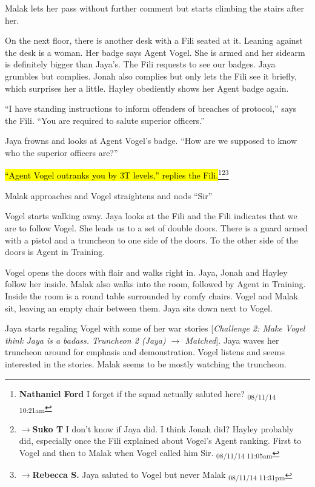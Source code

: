 Malak lets her pass without further comment but starts climbing the stairs after her.



On the next floor, there is another desk with a Fili seated at it.  Leaning against the desk is a woman. Her badge says Agent Vogel.  She is armed and her sidearm is definitely bigger than Jaya's.  The Fili requests to see our badges.  Jaya grumbles but complies.  Jonah also complies but only lets the Fili see it briefly, which surprises her a little.  Hayley obediently shows her Agent badge again.

``I have standing instructions to inform offenders of breaches of protocol,'' says the Fili.  ``You are required to salute superior officers.''

Jaya frowns and looks at Agent Vogel's badge.  ``How are we supposed to know who the superior officers are?''

\hl{``Agent Vogel outranks you by 3T levels,'' replies the Fili.}\footnote{\textbf{Nathaniel Ford }I forget if the squad actually saluted here? \textsubscript{08/11/14 10:21am}}\footnote{$\rightarrow$\textbf{Suko T }I don't know if Jaya did.  I think Jonah did?  Hayley probably did, especially once the Fili explained about Vogel's Agent ranking.  First to Vogel and then to Malak when Vogel called him Sir. \textsubscript{08/11/14 11:05am}}\footnote{$\rightarrow$\textbf{Rebecca S. }Jaya saluted to Vogel but never Malak \textsubscript{08/11/14 11:31pm}}

Malak approaches and Vogel straightens and nods ``Sir''



Vogel starts walking away.  Jaya looks at the Fili and the Fili indicates that we are to follow Vogel.  She leads us to a set of double doors.  There is a guard armed with a pistol and a truncheon to one side of the doors.  To the other side of the doors is Agent in Training.



Vogel opens the doors with flair and walks right in.  Jaya, Jonah and Hayley follow her inside.  Malak also walks into the room, followed by Agent in Training.  Inside the room is a round table surrounded by comfy chairs.  Vogel and Malak sit, leaving an empty chair between them.  Jaya sits down next to Vogel.  



Jaya starts regaling Vogel with some of her war stories {[}\textit{Challenge 2: Make Vogel think Jaya is a badass.  Truncheon 2 (Jaya) $\rightarrow$ Matched}{]}.  Jaya waves her truncheon around for emphasis and demonstration.  Vogel listens and seems interested in the stories.  Malak seems to be mostly watching the truncheon.



